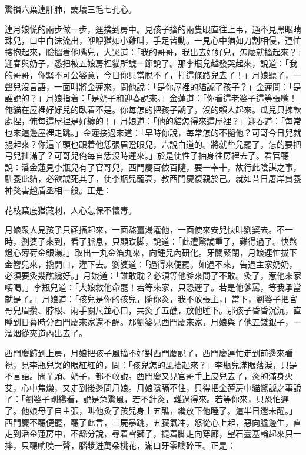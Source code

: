 \begin{myquote} 
驚損六葉連肝肺，諕壞三毛七孔心。
\end{myquote} 

連月娘慌的兩步做一步，逕撲到房中。見孩子搐的兩隻眼直往上弔，通不見黑眼睛珠兒，口中白沫流出，咿咿猶如小雞叫，手足皆動。一見心中猶如刀割相侵，連忙摟抱起來，臉搵着他嘴兒，大哭道：「我的哥哥，我出去好好兒，怎麼就搐起來？」迎春與奶子，悉把被五娘房裡貓所諕一節說了。那李瓶兒越發哭起來，說道：「我的哥哥，你緊不可公婆意，今日你只當脫不了，打這條路兒去了！」{}月娘聽了，一聲兒沒言語，一面叫將金蓮來，問他說：{}「是你屋裡的貓諕了孩子？」金蓮問：「是誰說的？」月娘指着：「是奶子和迎春說來。」金蓮道：「你看這老婆子這等張嘴！俺貓在屋裡好好兒的臥着不是。你每怎的把孩子諕了，沒的賴人起來。瓜兒只揀軟處捏，俺每這屋裡是好纏的！」月娘道：「他的貓怎得來這屋裡？」迎春道：「每常也來這邊屋裡走跳。」金蓮接過來道：「早時你說，每常怎的不撾他？可哥今日兒就撾起來？你這丫頭也跟着他恁張眉瞪眼兒，六說白道的。將就些兒罷了，怎的要把弓兒扯滿了？可哥兒俺每自恁沒時運來。」{}於是使性子抽身往房裡去了。看官聽說：潘金蓮見李瓶兒有了官哥兒，西門慶百依百隨，要一奉十，故行此陰謀之事，馴養此貓，必欲諕死其子，使李瓶兒寵衰，教西門慶復親於己。就如昔日屠岸賈養神獒害趙盾丞相一般。{}正是：

\begin{myquote} 
花枝葉底猶藏刺，人心怎保不懷毒。
\end{myquote} 

月娘衆人見孩子只顧搐起來，一面熬薑湯灌他，一面使來安兒快叫劉婆去。不一時，劉婆子來到，看了脈息，只顧跌脚，說道：「此遭驚諕重了，難得過了。快熬燈心薄荷金銀湯。」取出一丸金箔丸來，向鍾兒內研化。牙關緊閉，月娘連忙拔下金簪兒來，撬開口，灌下去。劉婆道：「過得來便罷。如過不來，告過主家奶奶，必須要灸幾醮纔好。」月娘道：「誰敢耽？必須等他爹來問了不敢。灸了，惹他來家喓喝。」李瓶兒道：「大娘救他命罷！若等來家，只恐遲了。若是他爹罵，等我承當就是了。」月娘道：「孩兒是你的孩兒，隨你灸，我不敢張主，」當下，劉婆子把官哥兒眉攢、脖根、兩手關尺並心口，共灸了五醮，放他睡下。那孩子昏昏沉沉，直睡到日暮時分西門慶來家還不醒。那劉婆見西門慶來家，月娘與了他五錢銀子，一溜烟從夾道內出去了。

西門慶歸到上房，月娘把孩子風搐不好對西門慶說了，西門慶連忙走到前邊來看視，見李瓶兒哭的眼紅紅的，問：「孩兒怎的風搐起來？」李瓶兒滿眼落淚，只是不言語。問丫頭、奶子，都不敢說。西門慶又見官哥手上皮兒去了，灸的滿身火艾，心中焦燥，又走到後邊問月娘。月娘隱瞞不住，只得把金蓮房中貓驚諕之事說了：「劉婆子剛纔看，說是急驚風，若不針灸，難過得來。若等你來，只恐怕遲了。他娘母子自主張，叫他灸了孩兒身上五醮，纔放下他睡了。這半日還未醒。」西門慶不聽便罷，聽了此言，三屍暴跳，五臟氣冲，怒從心上起，惡向膽邊生，直走到潘金蓮房中，不繇分說，尋着雪獅子，提着脚走向穿廊，望石臺基輪起來只一摔，只聽响喨一聲，腦漿迸萬朵桃花，滿口牙零噙碎玉。正是：

